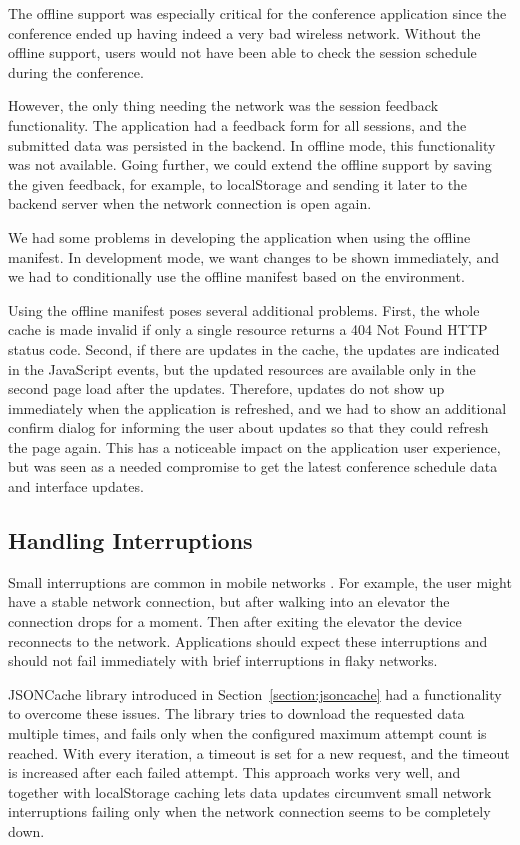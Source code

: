 The offline support was especially critical for the conference
application since the conference ended up having indeed a very bad
wireless network.  Without the offline support, users would not have
been able to check the session schedule during the conference.

However, the only thing needing the network was the session feedback
functionality. The application had a feedback form for all sessions,
and the submitted data was persisted in the backend. In offline mode,
this functionality was not available. Going further, we could extend
the offline support by saving the given feedback, for example, to
localStorage and sending it later to the backend server when the
network connection is open again.

We had some problems in developing the application when using the
offline manifest. In development mode, we want changes to be shown
immediately, and we had to conditionally use the offline manifest
based on the environment.

Using the offline manifest poses several additional problems. First,
the whole cache is made invalid if only a single resource returns a
404 Not Found HTTP status code. Second, if there are updates in the
cache, the updates are indicated in the JavaScript events, but the
updated resources are available only in the second page load after the
updates. Therefore, updates do not show up immediately when the
application is refreshed, and we had to show an additional confirm
dialog for informing the user about updates so that they could refresh
the page again. This has a noticeable impact on the application user
experience, but was seen as a needed compromise to get the latest
conference schedule data and interface updates.

\subsection{Handling Interruptions}

Small interruptions are common in mobile networks
\cite{zandy2002reliable}. For example, the user might have a stable
network connection, but after walking into an elevator the connection
drops for a moment. Then after exiting the elevator the device
reconnects to the network. Applications should expect these
interruptions and should not fail immediately with brief interruptions
in flaky networks.

JSONCache library introduced in Section~\ref{section:jsoncache} had a
functionality to overcome these issues. The library tries to download
the requested data multiple times, and fails only when the configured
maximum attempt count is reached. With every iteration, a timeout is
set for a new request, and the timeout is increased after each failed
attempt. This approach works very well, and together with localStorage
caching lets data updates circumvent small network interruptions
failing only when the network connection seems to be completely down.


